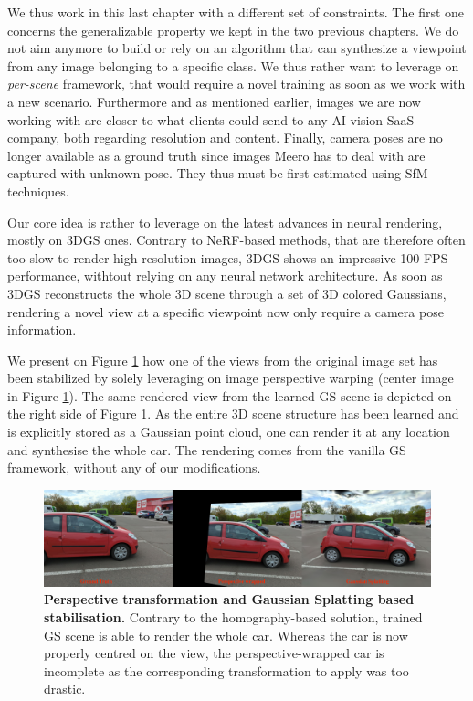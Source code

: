 We thus work in this last chapter with a different set of constraints. The first one concerns the generalizable property we kept in the two previous chapters. We do not aim anymore to build or rely on an algorithm that can synthesize a viewpoint from any image belonging to a specific class. We thus rather want to leverage on \textit{per-scene} framework, that would require a novel training as soon as we work with a new scenario. Furthermore and as mentioned earlier, images we are now working with are closer to what clients could send to any \ac{AI}-vision SaaS company, both regarding resolution and content. Finally, camera poses are no longer available as a ground truth since images Meero has to deal with are captured with unknown pose. They thus must be first estimated using \ac{SfM} techniques.

Our core idea is rather to leverage on the latest advances in neural rendering, mostly on 3D\ac{GS} ones. Contrary to \ac{NeRF}-based methods, that are therefore often too slow to render high-resolution images, 3D\ac{GS} shows an impressive 100 \ac{FPS} performance, withtout relying on any neural network architecture. As soon as 3D\ac{GS} reconstructs the whole 3D scene through a set of 3D colored Gaussians, rendering a novel view at a specific viewpoint now only require a camera pose information.

We present on Figure \ref{fig:gs-vs-homography-view3} how one of the views from the original image set has been stabilized by solely leveraging on image perspective warping (center image in Figure \ref{fig:gs-vs-homography-view3}). The same rendered view from the learned \ac{GS} scene is depicted on the right side of Figure \ref{fig:gs-vs-homography-view3}. As the entire 3D scene structure has been learned and is explicitly stored as a Gaussian point cloud, one can render it at any location and synthesise the whole car. The rendering comes from the vanilla \ac{GS} framework, without any of our modifications.

\begin{figure}[htb!]
  \center
\includegraphics[width=\linewidth]{images/gaussiansplatting/perspective-vs-gs.png}
\caption{\textbf{Perspective transformation and Gaussian Splatting based stabilisation. } Contrary to the homography-based solution, trained GS scene is able to render the whole car. Whereas the car is now properly centred on the view, the perspective-wrapped car is incomplete as the corresponding transformation to apply was too drastic.}
\label{fig:gs-vs-homography-view3}
\end{figure}

